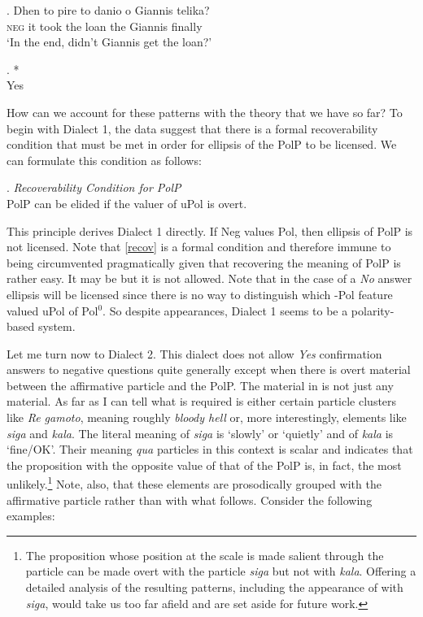 \documentclass[output=paper]{LSP/langsci}
\begin{document}
\exg.
Dhen to pire to danio o Giannis telika?\\
\textsc{neg} it took the loan the Giannis finally\\   \label{nq3}
\glt `In the end, didn't Giannis get the loan?'

\exg.
*\nai\\
Yes\\ \label{nq4}

How can we account for these patterns with the theory that we have so far?  To begin with Dialect 1, the data suggest that there is a formal recoverability condition that must be met in order for ellipsis of the PolP to be licensed.  We can formulate this condition as follows:

\Lsciex. \label{recov}
\textit{Recoverability Condition for PolP}\\
PolP can be elided if the valuer of uPol is overt.

This principle derives Dialect 1 directly.  If Neg values Pol, then ellipsis of PolP is not licensed.  Note that \ref{recov} is a formal condition and therefore immune to being circumvented pragmatically given that recovering the meaning of PolP is rather easy.  It may be but it is not allowed.  Note that in the case of a \textit{No} answer ellipsis will be licensed since there is no way to distinguish which -Pol feature valued uPol of Pol$^0$.   So despite appearances, Dialect 1 seems to be a polarity-based system.

Let me turn now to Dialect 2. This dialect does not allow \textit{Yes} confirmation  answers to negative questions quite generally except when there is overt material between the affirmative particle and the PolP.  The material in  is not just any material.  As far as I can tell what is required is either certain particle clusters like \textit{Re gamoto}, meaning roughly \textit{bloody hell} or, more interestingly, elements like \textit{siga} and \textit{kala}.  The literal meaning of \textit{siga} is `slowly' or `quietly' and of \textit{kala} is `fine/OK'.   Their meaning \textit{qua} particles in this context is scalar and indicates that the proposition with the opposite  value of that of the PolP is, in fact, the most unlikely.\footnote{The proposition whose position at the scale is made salient through the particle can be made overt with the particle \textit{siga} but not with \textit{kala}.  Offering a detailed analysis of the resulting patterns, including the appearance of   with \textit{siga}, would take us too far afield and are set aside for future work.}
Note, also, that these elements are prosodically grouped with the affirmative particle rather than with what follows. Consider the following examples:
 
\end{document}
